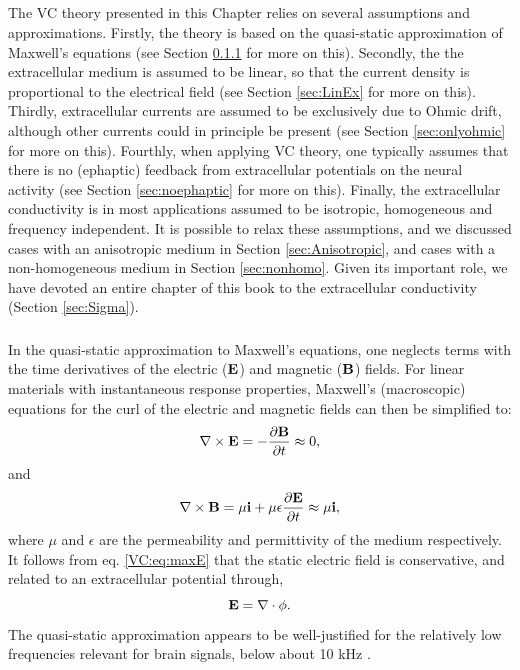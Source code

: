 \subsection{}
\label{sec:approximations}
The VC theory presented in this Chapter relies on several assumptions and approximations. Firstly, the theory is based on the 
quasi-static approximation of Maxwell's equations (see Section \ref{sec:quasistatic} for more on this). Secondly, the the extracellular medium is assumed to be linear, so that the current density is proportional to the electrical field (see Section \ref{sec:LinEx} for more on this). Thirdly, extracellular currents are assumed to be exclusively due to Ohmic drift, although other currents could in principle be present (see Section \ref{sec:onlyohmic} for more on this). Fourthly, when applying VC theory, one typically assumes that there is no (ephaptic) feedback from extracellular potentials on the neural activity (see Section \ref{sec:noephaptic} for more on this). Finally, the extracellular conductivity is in most applications assumed to be isotropic, homogeneous and frequency independent. It is possible to relax these assumptions, and we discussed cases with an anisotropic medium in Section \ref{sec:Anisotropic}, and cases with a non-homogeneous medium in Section \ref{sec:nonhomo}. Given its important role, we have devoted an entire chapter of this book to the extracellular conductivity (Section \ref{sec:Sigma}).

\subsubsection{}
\label{sec:quasistatic}
In the quasi-static approximation to Maxwell's equations, one neglects terms with the time derivatives of the electric (${\bf E}$) and magnetic (${\bf B}$) fields. For linear materials with instantaneous response properties, Maxwell's (macroscopic) equations for the curl of the electric and magnetic fields can then be simplified to:
\begin{equation}
\nabla \times {\bf E} = - \frac{\partial {\bf B}}{\partial t}  \approx 0, 
\label{VC:eq:maxE}
\end{equation}
and
\begin{equation}
\nabla \times {\bf B} = \mu{\bf i} + \mu \epsilon \frac{\partial {\bf E}}{\partial t} \approx  \mu {\bf i} ,
\label{VC:eq:maxB}
\end{equation}
where $\mu$ and $\epsilon$ are the permeability and permittivity of the medium respectively. It follows from eq. \ref{VC:eq:maxE} that the static electric field is conservative, and related to an extracellular potential through,
\begin{equation}
{\bf E} = \nabla \cdot \phi.
\label{VC:eq:conservative}
\end{equation}
The quasi-static approximation appears to be well-justified for the relatively low frequencies relevant for brain signals, below about 10 kHz \cite{Nunez2006, Grodzinsky2011}.


